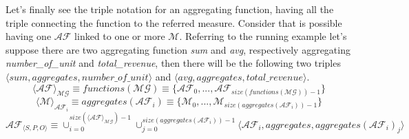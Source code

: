 \documentclass[12pt,a4paper]{report}
\newcommand\subject{S}
\newcommand\predicate{P}
\newcommand\object{O}
\newcommand\triple[1]{#1_{\set{\subject,\predicate,\object}}}
\newcommand\measure{\mathcal{M}}
\newcommand\multidimensionalGraph{\mathcal{MG}}
\newcommand\aggregatingFunction{\mathcal{AF}}
\newcommand\aggregatingFunctionFunLabel{aggregates}
\newcommand\functionsFunLabel{functions}
\newcommand\set[1]{\langle #1 \rangle}
\begin{document}
%
Let's finally see the triple notation for an aggregating function, having all the triple connecting the function to the referred measure.
%
Consider that is possible having one $\aggregatingFunction$ linked to one or more $\measure$.
%
Referring to the running example let's suppose there are two aggregating function \textit{sum} and \textit{avg}, respectively aggregating \textit{number\_of\_unit} and \textit{total\_revenue}, then there will be the following two triples $\set{sum,\aggregatingFunctionFunLabel,number\_of\_unit}$ and $\set{avg,\aggregatingFunctionFunLabel,total\_revenue}$.
%
\begin{equation}
    \set{\aggregatingFunction}_{\multidimensionalGraph} \equiv \functionsFunLabel(\multidimensionalGraph) \equiv \{\aggregatingFunction_{0},...,\aggregatingFunction_{size(\functionsFunLabel(\multidimensionalGraph)) - 1}\}
\end{equation}
%
\begin{equation}
    \set{\measure}_{\aggregatingFunction_{i}} \equiv \aggregatingFunctionFunLabel(\aggregatingFunction_{i}) \equiv \{\measure_{0},...,\measure_{size(\aggregatingFunctionFunLabel(\aggregatingFunction_{i})) - 1}\}
\end{equation}
%
\begin{equation}
    \triple{\aggregatingFunction} \equiv \cup_{i = 0}^{size(\set{\aggregatingFunction}_{\multidimensionalGraph}) - 1} \cup_{j = 0}^{size(\aggregatingFunctionFunLabel(\aggregatingFunction_{i})) - 1} \set{\aggregatingFunction_{i}, \aggregatingFunctionFunLabel,\aggregatingFunctionFunLabel(\aggregatingFunction_{i})_{j}}
\end{equation}
\end{document}
